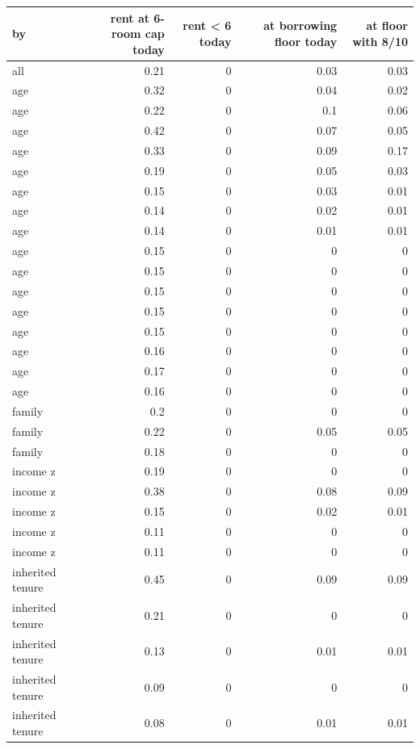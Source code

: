\begin{tabular}{lrrrr}
\toprule
by & rent at 6-room cap today & rent < 6 today & at borrowing floor today & at floor with 8/10 \\
\midrule
all & 0.21 & 0 & 0.03 & 0.03 \\
age & 0.32 & 0 & 0.04 & 0.02 \\
age & 0.22 & 0 & 0.1 & 0.06 \\
age & 0.42 & 0 & 0.07 & 0.05 \\
age & 0.33 & 0 & 0.09 & 0.17 \\
age & 0.19 & 0 & 0.05 & 0.03 \\
age & 0.15 & 0 & 0.03 & 0.01 \\
age & 0.14 & 0 & 0.02 & 0.01 \\
age & 0.14 & 0 & 0.01 & 0.01 \\
age & 0.15 & 0 & 0 & 0 \\
age & 0.15 & 0 & 0 & 0 \\
age & 0.15 & 0 & 0 & 0 \\
age & 0.15 & 0 & 0 & 0 \\
age & 0.15 & 0 & 0 & 0 \\
age & 0.16 & 0 & 0 & 0 \\
age & 0.17 & 0 & 0 & 0 \\
age & 0.16 & 0 & 0 & 0 \\
family & 0.2 & 0 & 0 & 0 \\
family & 0.22 & 0 & 0.05 & 0.05 \\
family & 0.18 & 0 & 0 & 0 \\
income z & 0.19 & 0 & 0 & 0 \\
income z & 0.38 & 0 & 0.08 & 0.09 \\
income z & 0.15 & 0 & 0.02 & 0.01 \\
income z & 0.11 & 0 & 0 & 0 \\
income z & 0.11 & 0 & 0 & 0 \\
inherited tenure & 0.45 & 0 & 0.09 & 0.09 \\
inherited tenure & 0.21 & 0 & 0 & 0 \\
inherited tenure & 0.13 & 0 & 0.01 & 0.01 \\
inherited tenure & 0.09 & 0 & 0 & 0 \\
inherited tenure & 0.08 & 0 & 0.01 & 0.01 \\
\bottomrule
\end{tabular}
